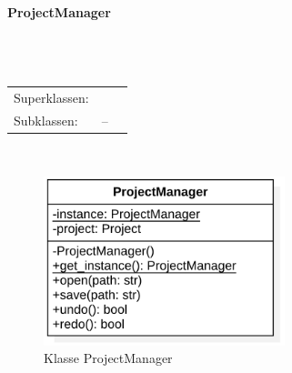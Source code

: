 \documentclass{article}
\newcommand{\classheader}[2][]{\paragraph{#2}
\mbox{}\textit{#1}\\\\}
\newcommand{\classref}[1]{\texttt{\nameref{cls:#1}}}
\begin{document}
\newpage
\classheader{ProjectManager}\label{cls:ProjectManager}
\begin{tabular}{lll}
 Superklassen: & \classref{FileManager}\\
 Subklassen: & --
\end{tabular}\\
\begin{figure}[H]%
    \centering
    \includegraphics[width=7cm]{docs/entwurf/Floriane/ProjectManager.png}
    \caption{Klasse ProjectManager}
\end{figure}
\end{document}

